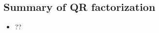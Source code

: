 
\begin{draft}
\section{Summary of QR factorization}
\label{sec:sumqr}

\begin{itemize}
\def\index#1{}%

\item ??
\end{itemize}


\end{draft}

\makeanswers

